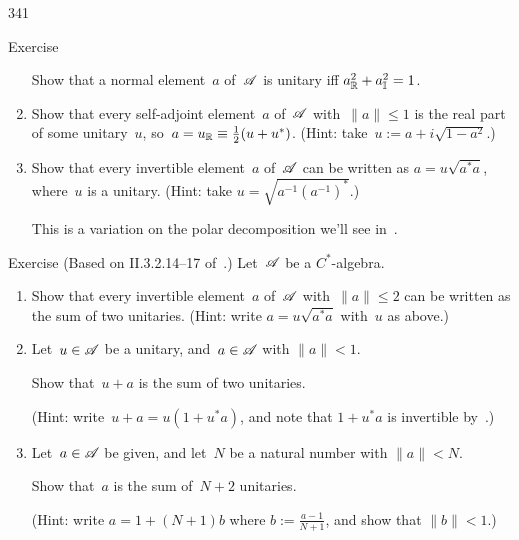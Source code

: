 \begin{parsec}{341}
\begin{point}{50}{Exercise}
\begin{enumerate}
Show that a normal element~$a$ of~$\mathscr{A}$ is unitary
        iff $a_{\mathbb{R}}^2 + a_{\mathbb{I}}^2 = 1$.
\item
Show that every self-adjoint element~$a$ of~$\mathscr{A}$
with~$\|a\|\leq 1$
is the real part of some unitary~$u$, 
        so~$a=u_{\mathbb{R}}\equiv \frac{1}{2}(u+u^*)$.
(Hint:
        take~$u := a + i\sqrt{1-a^2}$.)
\item
Show that every invertible element~$a$ of~$\mathscr{A}$ can be written
as $a=u\sqrt{a^*a}$,
where~$u$ is a unitary.
(Hint: take $u=\sqrt{a^{-1}(a^{-1})^*}$.)

This is a variation on the polar decomposition
we'll see in~.
\end{enumerate}
\spacingfix%
\end{point}%
\begin{point}{60}{Exercise}
(Based on II.3.2.14--17 of~\cite{blackadar2006operator}.)
Let~$\mathscr{A}$ be a $C^*$-algebra.
\begin{enumerate}
\item
Show that every invertible element~$a$ of~$\mathscr{A}$
with~$\|a\|\leq 2$ can be written
as the sum of two unitaries.
(Hint: write $a=u\sqrt{a^*a}$ with~$u$ as above.)
\item
Let~$u\in \mathscr{A}$ be a unitary, and~$a\in\mathscr{A}$ with $\|a\|< 1$.

Show that~$u+a$ is the sum of two unitaries.

(Hint: write~$u+a=u(1+u^*a)$, and
        note that $1+u^*a$ is invertible by~.)
\item
Let~$a\in \mathscr{A}$ be given,
and let~$N$ be a natural number with $\|a\| < N$.

Show that~$a$ is the sum of~$N+2$ unitaries. 

(Hint: write $a=1+(N+1)b$ where $b:=\frac{a-1}{N+1}$,
and show that $\|b\|< 1$.)


\end{enumerate}
\end{point}
\end{parsec}
